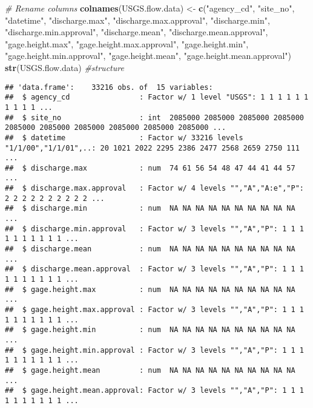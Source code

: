 \documentclass[]{article}
\newenvironment{Shaded}{\begin{snugshade}}{\end{snugshade}}
\newcommand{\KeywordTok}[1]{\textcolor[rgb]{0.13,0.29,0.53}{\textbf{#1}}}
\newcommand{\StringTok}[1]{\textcolor[rgb]{0.31,0.60,0.02}{#1}}
\newcommand{\CommentTok}[1]{\textcolor[rgb]{0.56,0.35,0.01}{\textit{#1}}}
\newcommand{\NormalTok}[1]{#1}
\begin{document}
\begin{Shaded}
\begin{Highlighting}[]
\CommentTok{# Rename columns}
\KeywordTok{colnames}\NormalTok{(USGS.flow.data) <-}\StringTok{ }\KeywordTok{c}\NormalTok{(}\StringTok{"agency_cd"}\NormalTok{, }\StringTok{"site_no"}\NormalTok{, }\StringTok{"datetime"}\NormalTok{, }
                              \StringTok{"discharge.max"}\NormalTok{, }\StringTok{"discharge.max.approval"}\NormalTok{, }
                              \StringTok{"discharge.min"}\NormalTok{, }\StringTok{"discharge.min.approval"}\NormalTok{, }
                              \StringTok{"discharge.mean"}\NormalTok{, }\StringTok{"discharge.mean.approval"}\NormalTok{, }
                              \StringTok{"gage.height.max"}\NormalTok{, }\StringTok{"gage.height.max.approval"}\NormalTok{, }
                              \StringTok{"gage.height.min"}\NormalTok{, }\StringTok{"gage.height.min.approval"}\NormalTok{, }
                              \StringTok{"gage.height.mean"}\NormalTok{, }\StringTok{"gage.height.mean.approval"}\NormalTok{)}
\KeywordTok{str}\NormalTok{(USGS.flow.data) }\CommentTok{#structure}
\end{Highlighting}
\end{Shaded}

\begin{verbatim}
## 'data.frame':    33216 obs. of  15 variables:
##  $ agency_cd                : Factor w/ 1 level "USGS": 1 1 1 1 1 1 1 1 1 1 ...
##  $ site_no                  : int  2085000 2085000 2085000 2085000 2085000 2085000 2085000 2085000 2085000 2085000 ...
##  $ datetime                 : Factor w/ 33216 levels "1/1/00","1/1/01",..: 20 1021 2022 2295 2386 2477 2568 2659 2750 111 ...
##  $ discharge.max            : num  74 61 56 54 48 47 44 41 44 57 ...
##  $ discharge.max.approval   : Factor w/ 4 levels "","A","A:e","P": 2 2 2 2 2 2 2 2 2 2 ...
##  $ discharge.min            : num  NA NA NA NA NA NA NA NA NA NA ...
##  $ discharge.min.approval   : Factor w/ 3 levels "","A","P": 1 1 1 1 1 1 1 1 1 1 ...
##  $ discharge.mean           : num  NA NA NA NA NA NA NA NA NA NA ...
##  $ discharge.mean.approval  : Factor w/ 3 levels "","A","P": 1 1 1 1 1 1 1 1 1 1 ...
##  $ gage.height.max          : num  NA NA NA NA NA NA NA NA NA NA ...
##  $ gage.height.max.approval : Factor w/ 3 levels "","A","P": 1 1 1 1 1 1 1 1 1 1 ...
##  $ gage.height.min          : num  NA NA NA NA NA NA NA NA NA NA ...
##  $ gage.height.min.approval : Factor w/ 3 levels "","A","P": 1 1 1 1 1 1 1 1 1 1 ...
##  $ gage.height.mean         : num  NA NA NA NA NA NA NA NA NA NA ...
##  $ gage.height.mean.approval: Factor w/ 3 levels "","A","P": 1 1 1 1 1 1 1 1 1 1 ...
\end{verbatim}
\end{document}
